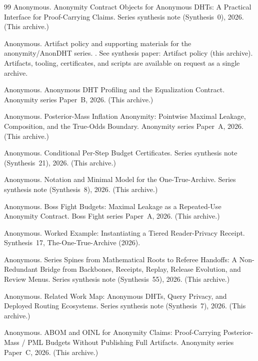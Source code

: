\documentclass[11pt]{article}
\begin{document}
\begin{thebibliography}{99}
Anonymous.
\newblock Anonymity Contract Objects for Anonymous DHTs: A Practical Interface for Proof-Carrying Claims.
\newblock Series synthesis note (Synthesis~0), 2026. (This archive.)

Anonymous.
\newblock Artifact policy and supporting materials for the anonymity/AnonDHT series.
.
\newblock See synthesis paper: Artifact policy (this archive). Artifacts, tooling, certificates, and scripts are available on request as a single archive.

Anonymous.
\newblock Anonymous {DHT} Profiling and the Equalization Contract.
\newblock Anonymity series Paper~B, 2026. (This archive.)


Anonymous.
\newblock Posterior-Mass Inflation Anonymity: Pointwise Maximal Leakage, Composition, and the True-Odds Boundary.
\newblock Anonymity series Paper~A, 2026. (This archive.)

Anonymous.
\newblock Conditional Per-Step Budget Certificates.
\newblock Series synthesis note (Synthesis~21), 2026. (This archive.)

Anonymous.
\newblock Notation and Minimal Model for the One-True-Archive.
\newblock Series synthesis note (Synthesis~8), 2026. (This archive.)

Anonymous.
\newblock Boss Fight Budgets: Maximal Leakage as a Repeated-Use Anonymity Contract.
\newblock Boss Fight series Paper~A, 2026. (This archive.)

Anonymous.
\newblock Worked Example: Instantiating a Tiered Reader-Privacy Receipt.
\newblock Synthesis~17, The-One-True-Archive (2026).

Anonymous.
\newblock Series Spines from Mathematical Roots to Referee Handoffs: A Non-Redundant Bridge from Backbones, Receipts, Replay, Release Evolution, and Review Menus.
\newblock Series synthesis note (Synthesis~55), 2026. (This archive.)

Anonymous.
\newblock Related Work Map: Anonymous {DHT}s, Query Privacy, and Deployed Routing Ecosystems.
\newblock Series synthesis note (Synthesis~7), 2026. (This archive.)


Anonymous.
\newblock ABOM and OINL for Anonymity Claims: Proof-Carrying Posterior-Mass / PML Budgets Without Publishing Full Artifacts.
\newblock Anonymity series Paper~C, 2026. (This archive.)

\end{thebibliography}
\end{document}

